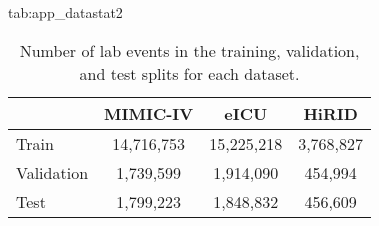 \begin{table}[h]
\floatconts
    {tab:app_datastat2}
    {\caption{Number of lab events in the training, validation, and test splits for each dataset.}}
    {
        \begin{tabular}{p{1.5cm}ccc}
            \toprule
            & MIMIC-IV & eICU & HiRID \\
            \midrule
            Train & 14,716,753 & 15,225,218 & 3,768,827 \\
            Validation & 1,739,599 & 1,914,090 & 454,994 \\
            Test & 1,799,223 & 1,848,832 & 456,609 \\
            \bottomrule        
        \end{tabular}
    }
\end{table}